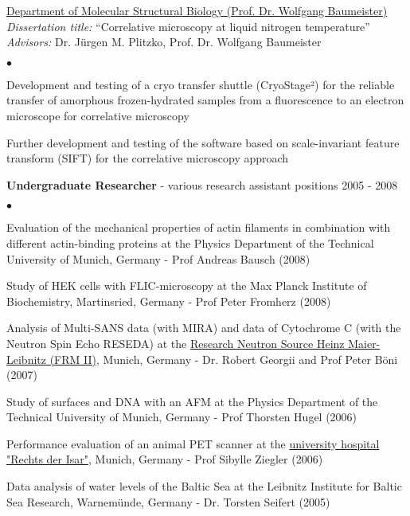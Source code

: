 \documentclass[margin,line]{res}
\newenvironment{list2}{
  \begin{list}{$\bullet$}{%
      \setlength{\itemsep}{0in}
      \setlength{\parsep}{0in} \setlength{\parskip}{0in}
      \setlength{\topsep}{0in} \setlength{\partopsep}{0in} 
      \setlength{\leftmargin}{0.2in}}}{\end{list}}
\begin{document}
\begin{resume}
\href{https://www.biochem.mpg.de/baumeister}{Department of Molecular Structural Biology (Prof. Dr. Wolfgang Baumeister)}\\
{\it Dissertation title:} “Correlative microscopy at liquid nitrogen temperature”\\
{\it Advisors:} Dr. Jürgen M. Plitzko, Prof. Dr. Wolfgang Baumeister\\
\vspace*{-2mm}
\begin{list2}
\vspace*{-1mm}
\item Development and testing of a cryo transfer shuttle (CryoStage²) for the reliable transfer of amorphous frozen-hydrated samples from a fluorescence to an electron microscope for correlative microscopy
\item Further development and testing of the software based on scale-invariant feature transform (SIFT) for the correlative microscopy approach
\end{list2}
{\bf Undergraduate Researcher} - various research assistant positions \hfill {2005 - 2008}\\
\vspace*{-2mm}
\begin{list2}
\vspace*{-1mm}
\item Evaluation of the mechanical properties of actin filaments in combination with different actin-binding proteins at the Physics Department of the Technical University of Munich, Germany - Prof Andreas Bausch (2008)
\item Study of HEK cells with FLIC-microscopy at the Max Planck Institute of Biochemistry, Martinsried, Germany - Prof Peter Fromherz (2008)
\item Analysis of Multi-SANS data (with MIRA) and data of Cytochrome C (with the Neutron Spin Echo RESEDA) at the  \href{https://www.frm2.tum.de/en/home/}{Research Neutron Source Heinz Maier-Leibnitz (FRM II)}, Munich, Germany - Dr. Robert Georgii and Prof Peter Böni (2007)
\item Study of surfaces and DNA with an AFM at the Physics Department of the Technical University of Munich, Germany - Prof Thorsten Hugel (2006)
\item Performance evaluation of an animal PET scanner at the  \href{https://www.mri.tum.de/}{university hospital "Rechts der Isar"}, Munich, Germany - Prof Sibylle Ziegler (2006)
\item Data analysis of water levels of the Baltic Sea at the Leibnitz Institute for Baltic Sea Research, Warnemünde, Germany - Dr. Torsten Seifert (2005)
\end{list2}


\end{resume}
\end{document}
